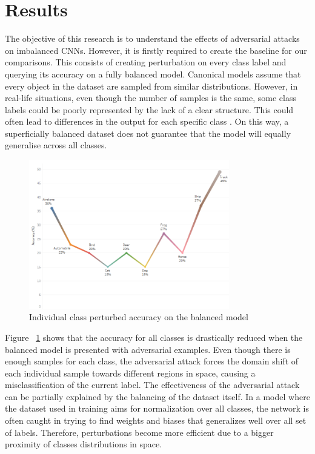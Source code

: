 \documentclass[runningheads,a4paper]{llncs}
\begin{document}
\section{Results}
The objective of this research is to understand the effects of adversarial attacks on imbalanced CNNs. However, it is firstly required to create the baseline for our comparisons. This consists of creating perturbation on every class label and querying its accuracy on a fully balanced model. Canonical models assume that every object in the dataset are sampled from similar distributions. However, in real-life situations, even though the number of samples is the same, some class labels could be poorly represented by the lack of a clear structure. This could often lead to differences in the output for each specific class \cite{krawczyk2016learning}. On this way, a superficially balanced dataset does not guarantee that the model will equally generalise across all classes.
\begin{figure}
	\centering
	\includegraphics[height=6.5cm]{balanced_perturbed.png}
	\caption{Individual class perturbed accuracy on the balanced model}
	\label{fig:balanced_perturbed}
\end{figure}

Figure ~\ref{fig:balanced_perturbed} shows that the accuracy for all classes is drastically reduced when the balanced model is presented with adversarial examples. Even though there is enough samples for each class, the adversarial attack forces the domain shift of each individual sample towards different regions in space, causing a misclassification of the current label. The effectiveness of the adversarial attack can be partially explained by the balancing of the dataset itself. In a model where the dataset used in training aims for normalization over all classes, the network is often caught in trying to find weights and biases that generalizes well over all set of labels. Therefore, perturbations become more efficient due to a bigger proximity of classes distributions in space.
\end{document}

